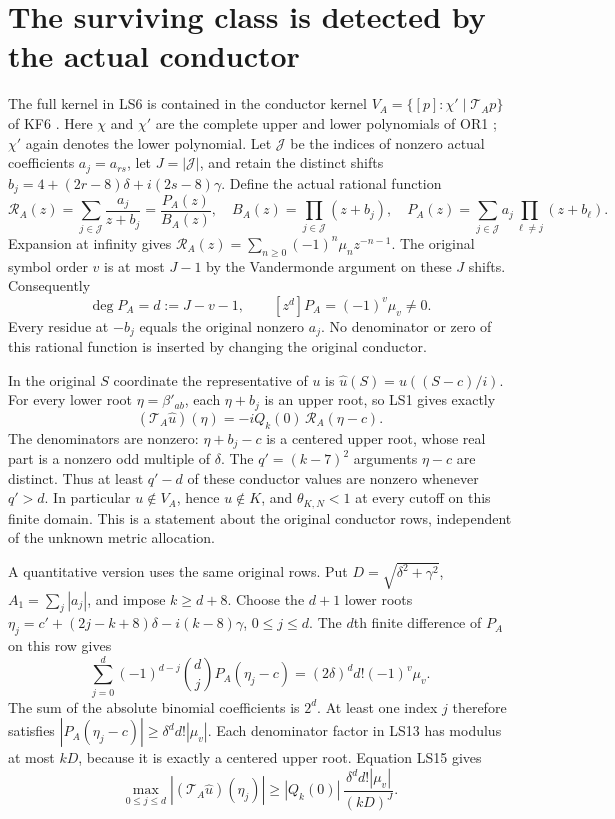 \documentclass[11pt]{article}
\begin{document}
\section{The surviving class is detected by the actual conductor}
The full kernel in LS6 is contained in the conductor kernel
$V_A=\{[p]:\chi'\mid\mathcal T_Ap\}$ of KF6 \cite{ls-KF}.
Here $\chi$ and $\chi'$ are the complete upper and lower polynomials
of OR1 \cite{ls-OR}; $\chi'$ again denotes the lower polynomial.
Let $\mathcal J$ be the indices of nonzero actual coefficients
$a_j=a_{rs}$, let $J=|\mathcal J|$, and retain the distinct shifts
$b_j=4+(2r-8)\delta+i(2s-8)\gamma$.
Define the actual rational function
\[
\mathcal R_A(z)=\sum_{j\in\mathcal J}\frac{a_j}{z+b_j}
=\frac{P_A(z)}{B_A(z)},\quad
B_A(z)=\prod_{j\in\mathcal J}(z+b_j),\quad
P_A(z)=\sum_{j\in\mathcal J}a_j\prod_{\ell\ne j}(z+b_\ell).
\tag{LS13}
\]
Expansion at infinity gives
$\mathcal R_A(z)=\sum_{n\ge0}(-1)^n\mu_n z^{-n-1}$.
The original symbol order $v$ is at most $J-1$ by the
Vandermonde argument on these $J$ shifts. Consequently
\[
\deg P_A=d:=J-v-1,\qquad
[z^d]P_A=(-1)^v\mu_v\ne0 .
\tag{LS14}
\]
Every residue at $-b_j$ equals the original nonzero $a_j$.
No denominator or zero of this rational function is inserted
by changing the original conductor.

In the original $S$ coordinate the representative of $u$ is
$\widehat u(S)=u((S-c)/i)$. For every lower root $\eta=\beta'_{ab}$,
each $\eta+b_j$ is an upper root, so LS1 gives exactly
\[
(\mathcal T_A\widehat u)(\eta)
=-iQ_k(0)\,\mathcal R_A(\eta-c).
\tag{LS15}
\]
The denominators are nonzero: $\eta+b_j-c$ is a centered
upper root, whose real part is a nonzero odd multiple of $\delta$.
The $q'=(k-7)^2$ arguments $\eta-c$ are distinct. Thus at least
$q'-d$ of these conductor values are nonzero whenever $q'>d$.
In particular $u\notin V_A$, hence $u\notin K$, and
$\theta_{K,N}<1$ at every cutoff on this finite domain.
This is a statement about the original conductor rows, independent
of the unknown metric allocation.

A quantitative version uses the same original rows. Put
$D=\sqrt{\delta^2+\gamma^2}$, $A_1=\sum_j|a_j|$, and impose
$k\ge d+8$. Choose the $d+1$ lower roots
$\eta_j=c'+(2j-k+8)\delta-i(k-8)\gamma$, $0\le j\le d$.
The $d$th finite difference of $P_A$ on this row gives
\[
\sum_{j=0}^d(-1)^{d-j}\binom dj P_A(\eta_j-c)
=(2\delta)^d d!(-1)^v\mu_v.
\]
The sum of the absolute binomial coefficients is $2^d$.
At least one index $j$ therefore satisfies
$|P_A(\eta_j-c)|\ge\delta^d d!|\mu_v|$.
Each denominator factor in LS13 has modulus at most $kD$,
because it is exactly a centered upper root. Equation LS15 gives
\[
\max_{0\le j\le d}|(\mathcal T_A\widehat u)(\eta_j)|
\ge |Q_k(0)|\,\frac{\delta^d d!|\mu_v|}{(kD)^J}.
\tag{LS16}
\]
\end{document}

